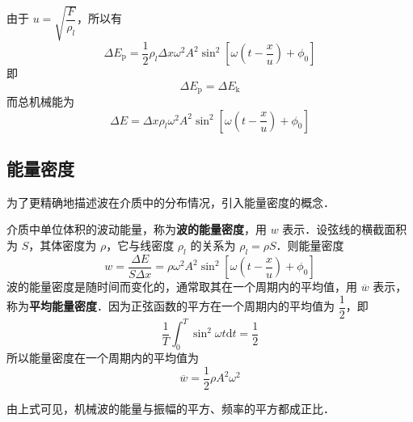 由于 $u=\sqrt{\dfrac{F}{\rho_{l}}}$，所以有
\begin{equation}
\Delta E_{\mathrm{p}}=\frac{1}{2} \rho_{l} \Delta x \omega^{2} A^{2} \sin ^{2}\left[\omega\left(t-\frac{x}{u}\right)+\phi_{0}\right]
\end{equation}
即
\begin{equation}
\Delta E_{\mathrm{p}}=\Delta E_{\mathrm{k}}
\end{equation}
而总机械能为
\begin{equation}
\Delta E=\Delta x \rho_{l} \omega^{2} A^{2} \sin ^{2}\left[\omega\left(t-\frac{x}{u}\right)+\phi_{0}\right]
\end{equation}

\subsection{能量密度}

为了更精确地描述波在介质中的分布情况，引入能量密度的概念．

介质中单位体积的波动能量，称为\textbf{波的能量密度}，用 $w$ 表示．设弦线的横截面积为 $S$，其体密度为 $\rho$，它与线密度 $\rho_l$ 的关系为 $\rho_l=\rho S$．则能量密度
\begin{equation}
w=\frac{\Delta E}{S \Delta x}=\rho \omega^{2} A^{2} \sin ^{2}\left[\omega\left(t-\frac{x}{u}\right)+\phi_{0}\right]
\end{equation}
波的能量密度是随时间而变化的，通常取其在一个周期内的平均值，用 $\overline w$ 表示，称为\textbf{平均能量密度}．因为正弦函数的平方在一个周期内的平均值为 $\dfrac 12$，即
\begin{equation}
\frac{1}{T} \int_{0}^{T} \sin ^{2} \omega t \mathrm{d} t=\frac{1}{2}
\end{equation}
所以能量密度在一个周期内的平均值为
\begin{equation}
\overline{w}=\frac{1}{2} \rho A^{2} \omega^{2}
\end{equation}

由上式可见，机械波的能量与振幅的平方、频率的平方都成正比．